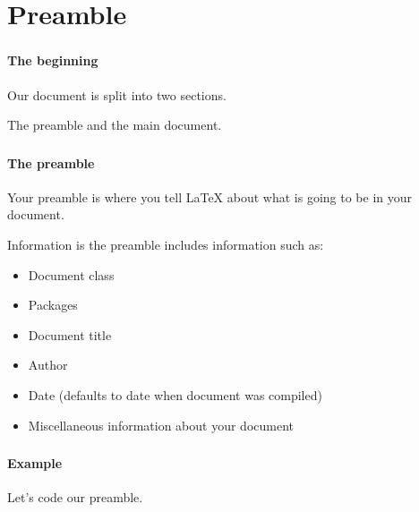 \documentclass{beamer}
\begin{document}
	\section{Preamble}
	\begin{frame}
		\frametitle{\secname}
		\framesubtitle{The beginning}
		Our document is split into two sections.

		The \alert{preamble} and the \alert{main document}.
	\end{frame}
	\begin{frame}
		\frametitle{\secname}
		\framesubtitle{The preamble}
		Your preamble is where you tell \LaTeX{} about what is going to be in your document.

		Information is the preamble includes information such as:
		\begin{itemize}[<+->]
			\item Document class
			\item Packages
			\item Document title
			\item Author
			\item Date (defaults to date when document was compiled)
			\item Miscellaneous information about your document
		\end{itemize}
	\end{frame}
	\begin{frame}
		\frametitle{\secname}
		\framesubtitle{Example}
		Let's code our preamble.
		
	\end{frame}
\end{document}
